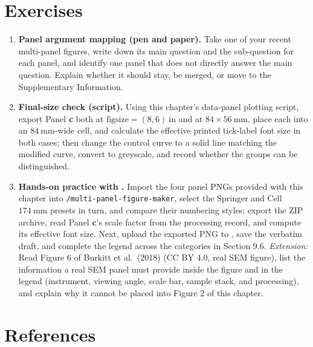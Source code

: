 \section{Exercises}

\begin{enumerate}
\item \textbf{Panel argument mapping (pen and paper).} Take one of your recent multi-panel figures, write down its main question and the sub-question for each panel, and identify one panel that does not directly answer the main question. Explain whether it should stay, be merged, or move to the Supplementary Information.
\item \textbf{Final-size check (script).} Using this chapter's data-panel plotting script, export Panel \textbf{c} both at $\text{figsize}=(8,6)\ \text{in}$ and at $84 \times 56\ \text{mm}$, place each into an $84\ \text{mm}$-wide cell, and calculate the effective printed tick-label font size in both cases; then change the control curve to a solid line matching the modified curve, convert to greyscale, and record whether the groups can be distinguished.
\item \textbf{Hands-on practice with \scidraw{}.} Import the four panel PNGs provided with this chapter into \texttt{/multi-panel-\allowbreak figure-\allowbreak maker}, select the Springer and Cell $174\ \text{mm}$ presets in turn, and compare their numbering styles; export the ZIP archive, read Panel \textbf{c}'s scale factor from the processing record, and compute its effective font size. Next, upload the exported PNG to , save the verbatim draft, and complete the legend across the categories in Section 9.6. \emph{Extension:} Read Figure 6 of Burkitt et al.\ (2018) (CC BY 4.0, real SEM figure), list the information a real SEM panel must provide inside the figure and in the legend (instrument, viewing angle, scale bar, sample stack, and processing), and explain why it cannot be placed into Figure 2 of this chapter.
\end{enumerate}

\section*{References}

